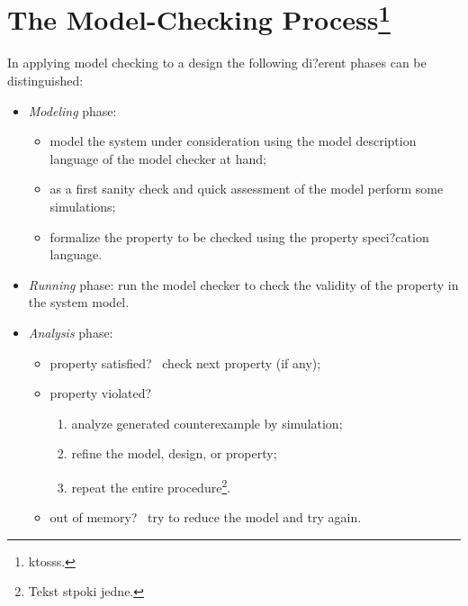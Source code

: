 \documentclass[a4paper,12pt]{article}
\begin{document}
\section{The Model-Checking Process\protect\footnote{ktosss.}}
\label{sec:Model-Checking-Process}

In applying model checking to a design the 
following di?erent phases can be distinguished:

\renewcommand{\theenumi}{(\Alph{enumi})}


\begin{itemize}
\item \emph{Modeling} phase:
\begin{itemize}
\item model the system under consideration using the model description language of 
the model checker at hand;
\item as a first sanity check and quick assessment 
of the model perform some simulations;
\item formalize the property to be 
checked using the property speci?cation language.
\end{itemize}
\item \emph{Running} phase: run the model checker to check the validity of the property in the system 
model.
\item \emph{Analysis} phase:
\begin{itemize}
\item property satisfied? \textrightarrow~check next property (if any); 
\item property violated? \textrightarrow
\begin{enumerate}
\item analyze generated counterexample by simulation; 
\item refine the model, design, or property;
\item repeat the entire procedure\footnote{Tekst stpoki jedne.}.
\end{enumerate}
\item out of memory? \textrightarrow~try to reduce the model and try again.
\end{itemize}
\end{itemize}
\end{document}

